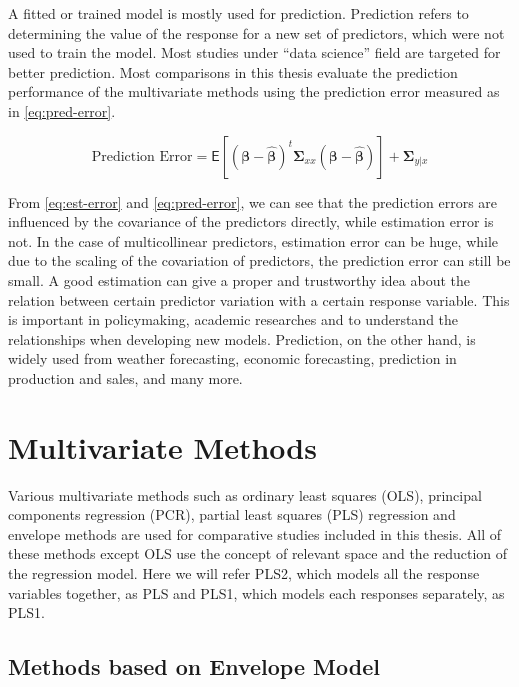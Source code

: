 \documentclass[11pt,twoside,openright,titlepage,
  headinclude,footinclude,BCOR=5mm,
  numbers=noenddot,cleardoublepage=empty,
  tablecaptionabove, dottedtoc,
  bibliography=totoc,paper=a4]{scrreprt}
\begin{document}
A fitted or trained model is mostly used for prediction. Prediction refers to determining the value of the response for a new set of predictors, which were not used to train the model. Most studies under ``data science'' field are targeted for better prediction. Most comparisons in this thesis evaluate the prediction performance of the multivariate methods using the prediction error measured as in \eqref{eq:pred-error}.

\begin{equation}
\text{Prediction Error} = \mathsf{E}\left[
  \left(\boldsymbol{\beta} - \hat{\boldsymbol{\beta}}\right)^t
  \boldsymbol{\Sigma}_{xx}
  \left(\boldsymbol{\beta} - \hat{\boldsymbol{\beta}}\right)
\right] + \boldsymbol{\Sigma}_{y|x}
\label{eq:pred-error}
\end{equation}

From \eqref{eq:est-error} and \eqref{eq:pred-error}, we can see that the prediction errors are influenced by the covariance of the predictors directly, while estimation error is not. In the case of multicollinear predictors, estimation error can be huge, while due to the scaling of the covariation of predictors, the prediction error can still be small. A good estimation can give a proper and trustworthy idea about the relation between certain predictor variation with a certain response variable. This is important in policymaking, academic researches and to understand the relationships when developing new models. Prediction, on the other hand, is widely used from weather forecasting, economic forecasting, prediction in production and sales, and many more.

\hypertarget{multivariate-methods}{%
\section{Multivariate Methods}\label{multivariate-methods}}

Various multivariate methods such as ordinary least squares (OLS), principal components regression (PCR), partial least squares (PLS) regression and envelope methods are used for comparative studies included in this thesis. All of these methods except OLS use the concept of relevant space and the reduction of the regression model. Here we will refer PLS2, which models all the response variables together, as PLS and PLS1, which models each responses separately, as PLS1.

\hypertarget{methods-based-on-envelope-model}{%
\subsection{Methods based on Envelope Model}\label{methods-based-on-envelope-model}}
\end{document}
